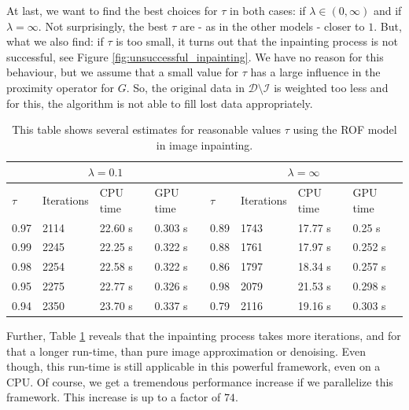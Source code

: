 \documentclass[abstracton]{scrreprt}
\begin{document}
        At last, we want to find the best choices for $\tau$ in both cases: if $\lambda \in (0, \infty)$ and if $\lambda = \infty$. Not surprisingly, the best $\tau$ are - as in the other models - closer to $1$. But, what we also find: if $\tau$ is too small, it turns out that the inpainting process is not successful, see Figure \ref{fig:unsuccessful_inpainting}. We have no reason for this behaviour, but we assume that a small value for $\tau$ has a large influence in the proximity operator for $G$. So, the original data in $\mathcal{D} \setminus \mathcal{I}$ is weighted too less and for this, the algorithm is not able to fill lost data appropriately.
            \begin{table}[!ht]
                \parbox{.9\linewidth}{
                \centering
                    \begin{tabular}{| l | l | l | l | l | l | l | l |}
                        \hline
                        \multicolumn{4}{|c|}{$\lambda = 0.1$} & \multicolumn{4}{|c|}{$\lambda = \infty$} \\ \hline\hline
                        $\tau$ & Iterations & CPU time & GPU time & $\tau$ & Iterations & CPU time & GPU time \\ \hline
                        0.97 & 2114 & 22.60 s & 0.303 s & 0.89 & 1743 & 17.77 s & 0.25 s \\ \hline
                        0.99 & 2245 & 22.25 s & 0.322 s & 0.88 & 1761 & 17.97 s & 0.252 s \\ \hline
                        0.98 & 2254 & 22.58 s & 0.322 s & 0.86 & 1797 & 18.34 s & 0.257 s \\ \hline
                        0.95 & 2275 & 22.77 s & 0.326 s & 0.98 & 2079 & 21.53 s & 0.298 s \\ \hline
                        0.94 & 2350 & 23.70 s & 0.337 s & 0.79 & 2116 & 19.16 s & 0.303 s \\ \hline
                    \end{tabular}
                }
                \caption[Best estimate of $\tau$ for image inpainting.]{This table shows several estimates for reasonable values $\tau$ using the ROF model in image inpainting.}
                \label{tab:best_tau_inpaint}
            \end{table}
        Further, Table \ref{tab:best_tau_inpaint} reveals that the inpainting process takes more iterations, and for that a longer run-time, than pure image approximation or denoising. Even though, this run-time is still applicable in this powerful framework, even on a CPU. Of course, we get a tremendous performance increase if we parallelize this framework. This increase is up to a factor of $74$.
\end{document}
